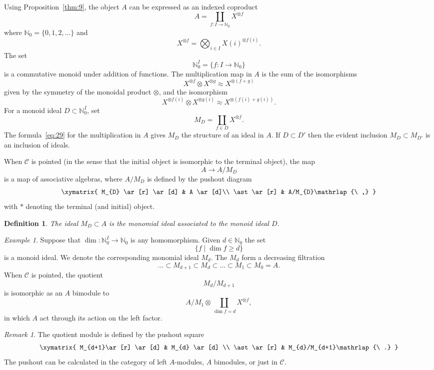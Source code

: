 \documentclass{amsart}
\newtheorem{definition}[equation]{Definition}
\newenvironment{defin}{\begin{definition}\rm}{\end{definition}}
\newtheorem{rem}[equation]{Remark}
\theoremstyle{definition}
\newtheorem{defin}[equation]{Definition}
\theoremstyle{remark}
\newtheorem{rem}[equation]{Remark}
\newtheorem{eg}[equation]{Example}
\newcommand{\cat}[1]{{\mathcal #1}}
\newcommand{\nat}{\mathbb N_{0}}
\begin{document}
Using Proposition~\ref{thm:9}, the object $A$ can be expressed as an
indexed coproduct
\[
A=\coprod_{f:I\to \nat} X^{\otimes f}
\]
where $\nat=\{0,1,2,\dots \}$ and 
\[
X^{\otimes f}=\bigotimes_{i\in I}X(i)^{\otimes f(i)}.  
\]
The set
\[
\nat^{I}=\{f:I\to \nat \}
\]
is a commutative monoid under addition of functions.  The
multiplication map in $A$ is the sum of the isomorphisms
\begin{equation}
\label{eq:29}
X^{\otimes f}\otimes X^{\otimes g}\approx X^{\otimes(f+g)}
\end{equation}
given by the symmetry of the monoidal product $\otimes$, and the
isomorphism
\[
X^{\otimes f(i)}\otimes X^{\otimes g(i)} \approx X^{\otimes(f(i)+g(i))}.
\]
For a monoid ideal $D\subset \nat^{I}$, set
\[
M_{D}=\coprod_{f\in D} X^{\otimes f}.
\]
The formula~\eqref{eq:29} for the multiplication in $A$ gives $M_{D}$
the structure of an ideal in $A$.  If $D\subset D'$ then the evident
inclusion $M_{D}\subset M_{D'}$ is an inclusion of ideals.

When $\cat C$ is pointed (in the sense that the initial object is
isomorphic to the terminal object), the map
\[
A\to A/M_{D}
\]
is a map of associative algebras, where $A/M_{D}$ is defined by the
pushout diagram 
\[
\xymatrix{
M_{D}   \ar[r] \ar[d]  & A \ar[d]\\
\ast   \ar[r] & A/M_{D}\mathrlap{\ ,}
}
\]
with $\ast$ denoting the terminal (and initial) object.

\begin{defin}
The ideal $M_{D}\subset A$ is the {\em  monomial ideal} associated to the
monoid ideal $D$.
\end{defin}

\begin{eg}
\label{eg:6}
Suppose that $\dim:\nat^{I}\to \nat$ is any homomorphism.   Given 
$d\in\nat$ the set 
\[
\{f\mid \dim f\ge d\}
\]
is a monoid ideal.   We denote the corresponding monomial ideal
$M_{d}$.     The $M_{d}$ form a
decreasing filtration
\[
\dots \subset M_{d+1}\subset M_{d}\subset\dots\subset M_{1}\subset M_{0}=A.
\]
When $\cat C$ is pointed, the quotient
\[
M_{d}/M_{d+1}
\]
is isomorphic as an $A$ bimodule to 
\[
A/M_{1}\otimes \coprod_{\dim f=d} X^{\otimes f},
\]
in which $A$ act through its action on the left factor. 
\end{eg}

\begin{rem}
\label{rem:4}
The quotient module is defined by the pushout square
\[
\xymatrix{
M_{d+1}\ar[r] \ar[d] & M_{d} \ar[d] \\
\ast \ar[r] & M_{d}/M_{d+1}\mathrlap{\ .}
}
\]
The pushout can be calculated in the category of left $A$-modules, $A$
bimodules, or just in $\cat C$.
\end{rem}
\end{document}
